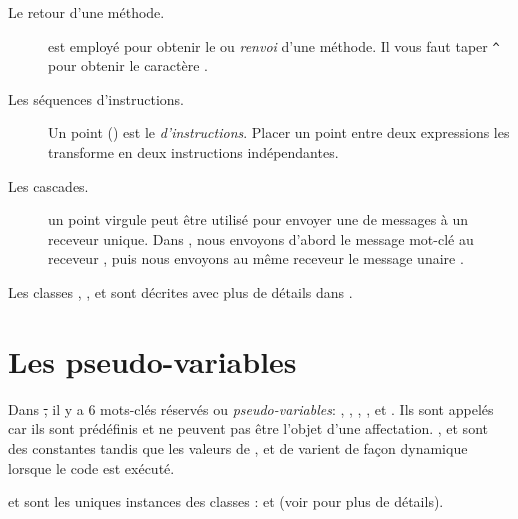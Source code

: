\documentclass[a4paper,10pt,twoside]{book}
\begin{document}
\begin{description}
\item[Le retour d'une m\'{e}thode.] \ct{^} est employ\'{e} pour
  obtenir le  ou \emph{renvoi} d'une m\'{e}thode.  Il
  vous faut taper \verb|^| pour obtenir le caract\`{e}re \ct{^}.

\item[Les séquences d'instructions.]	Un point () est le
   \emph{d'instructions}. Placer un point entre deux expressions les transforme en deux instructions ind\'{e}pendantes.	

\item[Les cascades.] un point virgule peut \^{e}tre utilis\'{e} pour envoyer une  de messages \`{a} un receveur unique. Dans , nous envoyons d'abord le message mot-cl\'{e}  au receveur  , puis nous envoyons au m\^{e}me receveur le message unaire .

\end{description}

Les classes , ,  et  sont d\'{e}crites avec plus de d\'{e}tails dans .

\section{Les pseudo-variables}

Dans \st, il y a 6 mots-cl\'{e}s r\'{e}serv\'{e}s ou  \emph{pseudo-variables}:
, ,  ,  ,
 et .
Ils sont appel\'{e}s  car ils sont pr\'{e}d\'{e}finis et ne peuvent pas \^{e}tre l'objet d'une affectation.
,  et  sont des constantes tandis que les valeurs de ,  et de  varient de fa\c{c}on dynamique lorsque le code est ex\'{e}cut\'{e}. 

 et  sont les uniques instances des classes
:  et  (voir  
pour plus de d\'{e}tails).
\end{document}
